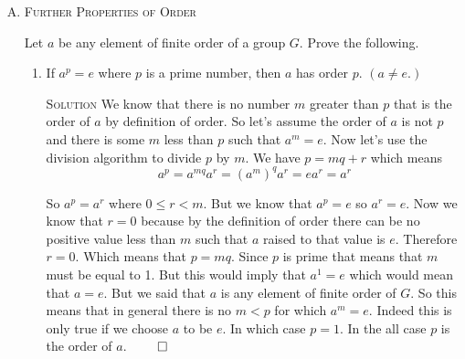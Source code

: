 \documentclass[twoside]{amsart}
\newcommand{\solution}{\textsc{Solution}\xspace}
\newcommand{\blank}{\vspace{5pt}}
\newcommand{\itm}{\blank\item}
\newcommand{\sol}{\blank\noindent\solution}
\newcommand{\ord}{\mathop{\mathrm{ord}}}
\begin{document}
\begin{enumerate}[A.]
\begin{enumerate}[1]
      Now I can use the same trick as the last two problems to prove
      that there is no nuber $m$ smaller than  $n$  such that $(ba)^m = e$.
      Let's assume that $m < n$ and $(ba)^m = e$. Then I have
      \[
         \underbrace{(ba)(ba) \cdots (ba)}_{m\text{ times}}b = 
         b\underbrace{(ab)(ab) \cdots (ab)}_{m\text{ times}} = be
      \]
      and using cancellation laws we have $(ab)^m = e$ which can't be
      becaues the order of $ab$ is $n$. Therefore the order
      of $ba$ equals the order of $ab$. $\qed$

      \itm $\ord(abc) = \ord(cab) = \ord(bca)$.

      \sol Assume the order of $abc$ is $n$. Then $(abc)^n = e$.
      Let's examine $(cab)^nc$. And use the same expansion trick
      from last time.

      \[
         (cab)^nc = c(abc)^n = c
      \]

      Using cancellation we get $(cab)^n = e$. We can use the same trick
      as last time to prove that $n$ is the smallest number for which
      this is true.  And we can use the same trick for $bca$. $\qed$

      \itm Let $x=a_1 a_2 \ldots a_n$, and let $y$ be a product of the same
      factors, permutated cyclically. (That is, $y = a_k a_{k+1} \ldots
      a_n a_1 \ldots a_{k-1}$.) Then $\ord(x) = \ord(y)$.

      \sol Use the exact same tricks from the last two problems. $\qed$

   \end{enumerate}

   \itm \textsc{Further Properties of Order}
   
   \noindent Let $a$ be any element of finite order of a group $G$. Prove
   the following.

   \begin{enumerate}[1]
      \itm If $a^p = e$ where $p$ is a prime number, then $a$ has order
      $p$. $(a \ne e.)$

      \sol We know that there is no number $m$ greater than $p$ that is
      the order of $a$ by definition of order. So let's assume the order of
      $a$ is not $p$ and there is some $m$ less than $p$ such that
      $a^m = e$. Now let's use the division algorithm to divide $p$
      by $m$. We have $p = mq + r$ which means
      \[
         a^p = a^{mq} a^r = (a^m)^q a^r = e a^r = a^r
      \]

      So $a^p = a^r$ where $0 \leq r < m$. But we know that $a^p = e$ so
      $a^r = e$. Now we know that $r = 0$ because by the definition of order
      there can be no positive value less than $m$ such that $a$ raised
      to that value is $e$. Therefore $r=0$. Which means that $p = mq$. 
      Since $p$ is prime that means that $m$ must be equal to 1. But this
      would imply that $a^1 = e$ which would mean that $a=e$. But we said
      that $a$ is any element of finite order of $G$. So this means that
      in general there is no $m < p$ for which $a^m = e$. Indeed this is
      only true if we choose $a$ to be $e$. In which case $p = 1$. In the
      all case $p$ is the order of $a$. $\qed$


\end{enumerate}
\end{enumerate}
\end{document}

